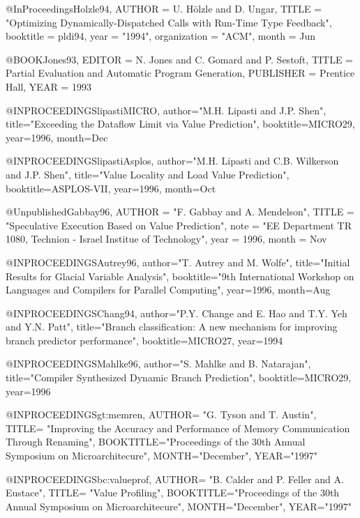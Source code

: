 @InProceedings{Holzle94,
        AUTHOR = {U. H\"olzle and D. Ungar},
        TITLE = "Optimizing Dynamically-Dispatched Calls with Run-Time
		  Type Feedback",
        booktitle = pldi94,
        year =   "1994",
        organization = "ACM",
        month = Jun
}

@BOOK{Jones93,
	EDITOR = {N. Jones and C. Gomard and P. Sestoft},
	TITLE = {Partial Evaluation and Automatic Program Generation},
	PUBLISHER = {Prentice Hall},
	YEAR = {1993}
}

@INPROCEEDINGS{lipastiMICRO,	
  author="M.H. Lipasti and J.P. Shen",
  title="Exceeding the Dataflow Limit via Value Prediction",
  booktitle=MICRO29,
  year=1996,
  month=Dec
}


@INPROCEEDINGS{lipastiAsplos,	
  author="M.H. Lipasti and C.B. Wilkerson and J.P. Shen",
  title="Value Locality and Load Value Prediction",
  booktitle=ASPLOS-VII,
  year=1996,
  month=Oct
}

@Unpublished{Gabbay96,
        AUTHOR = "F. Gabbay and A. Mendelson",
        TITLE = "Speculative Execution Based on Value Prediction",
        note = "EE  Department TR 1080, Technion - Israel Institue of Technology",
        year =  1996,
	month = Nov
}


@INPROCEEDINGS{Autrey96,	
  author="T. Autrey and M. Wolfe",
  title="Initial Results for Glacial Variable Analysis",
  booktitle="9th International Workshop on Languages and Compilers for Parallel Computing",
  year=1996,
  month=Aug
}


@INPROCEEDINGS{Chang94,	
  author="P.Y. Change and E. Hao and T.Y. Yeh and Y.N. Patt",
  title="Branch classification: A new mechanism for improving branch
		  predictor performance",
  booktitle=MICRO27,
  year=1994
}


@INPROCEEDINGS{Mahlke96,	
  author="S. Mahlke and B. Natarajan",
  title="Compiler Synthesized Dynamic Branch Prediction",
  booktitle=MICRO29,
  year=1996
}




@INPROCEEDINGS{gt:memren,
AUTHOR= "G. Tyson and T. Austin",
TITLE= "Improving the Accuracy and Performance of Memory Communication Through Renaming",
BOOKTITLE="Proceedings of the 30th Annual Symposium on Microarchitecure",
MONTH="December",
YEAR="1997"}

@INPROCEEDINGS{bc:valueprof,
AUTHOR= "B. Calder and P. Feller and A. Eustace",
TITLE= "Value Profiling",
BOOKTITLE="Proceedings of the 30th Annual Symposium on Microarchitecure",
MONTH="December",
YEAR="1997"}

